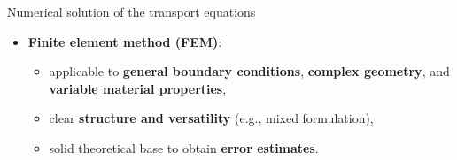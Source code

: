 \begin{frame}{Numerical solution of the transport equations}
\begin{itemize}
%
\pause
\item \alert{\bf Finite element method (FEM)}:
\begin{itemize}
	\item applicable to {\bf general boundary conditions}, {\bf complex geometry}, and {\bf variable material properties},
	\item clear {\bf structure and versatility} (e.g., mixed formulation), 
	\item solid theoretical base to obtain {\bf error estimates}.
\end{itemize}
%

\end{itemize}
\end{frame}
%
%
